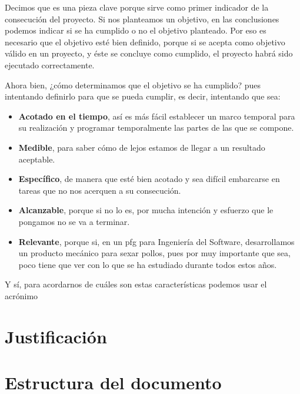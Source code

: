         Decimos que es una pieza clave porque sirve como primer indicador de la consecución del proyecto. Si nos planteamos un objetivo, en las conclusiones podemos indicar si se ha cumplido o no el objetivo planteado. Por eso es necesario que el objetivo esté bien definido, porque si se acepta como objetivo válido en un proyecto, y éste se concluye como cumplido, el proyecto habrá sido ejecutado correctamente.

        Ahora bien, ¿cómo determinamos que el objetivo se ha cumplido? pues intentando definirlo para que se pueda cumplir, es decir, intentando que sea:

        \begin{itemize}
            \item \textbf{Acotado en el tiempo}, así es más fácil establecer un marco temporal para su realización y programar temporalmente las partes de las que se compone.
            \item \textbf{Medible}, para saber cómo de lejos estamos de llegar a un resultado aceptable.
            \item \textbf{Específico}, de manera que esté bien acotado y sea difícil embarcarse en tareas que no nos acerquen a su consecución.
            \item \textbf{Alcanzable}, porque si no lo es, por mucha intención y esfuerzo que le pongamos no se va a terminar.
            \item \textbf{Relevante}, porque si, en un \gls{pfg} para Ingeniería del Software, desarrollamos un producto mecánico para sexar pollos, pues por muy importante que sea, poco tiene que ver con lo que se ha estudiado durante todos estos años.
        \end{itemize}

        Y sí, para acordarnos de cuáles son estas características podemos usar el acrónimo %

\section{Justificación}
\section{Estructura del documento}